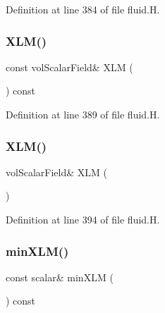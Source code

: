 Definition at line 384 of file fluid.\+H.

\mbox{\label{classFoam_1_1fluid_a88c32fe097e18bab02f7efc093e98ece}} 
\subsubsection{\texorpdfstring{X\+L\+M()}{XLM()}\hspace{0.1cm}{\footnotesize\ttfamily [1/2]}}
{\footnotesize\ttfamily const vol\+Scalar\+Field\& X\+LM (\begin{DoxyParamCaption}{ }\end{DoxyParamCaption}) const\hspace{0.3cm}{\ttfamily [inline]}}



Definition at line 389 of file fluid.\+H.

\mbox{\label{classFoam_1_1fluid_a52ccb918a44f4f0cad7e95ca5dff7b14}} 
\subsubsection{\texorpdfstring{X\+L\+M()}{XLM()}\hspace{0.1cm}{\footnotesize\ttfamily [2/2]}}
{\footnotesize\ttfamily vol\+Scalar\+Field\& X\+LM (\begin{DoxyParamCaption}{ }\end{DoxyParamCaption})\hspace{0.3cm}{\ttfamily [inline]}}



Definition at line 394 of file fluid.\+H.

\mbox{\label{classFoam_1_1fluid_a24ac4971d33010828584472dcfae5907}} 
\subsubsection{\texorpdfstring{min\+X\+L\+M()}{minXLM()}}
{\footnotesize\ttfamily const scalar\& min\+X\+LM (\begin{DoxyParamCaption}{ }\end{DoxyParamCaption}) const\hspace{0.3cm}{\ttfamily [inline]}}



